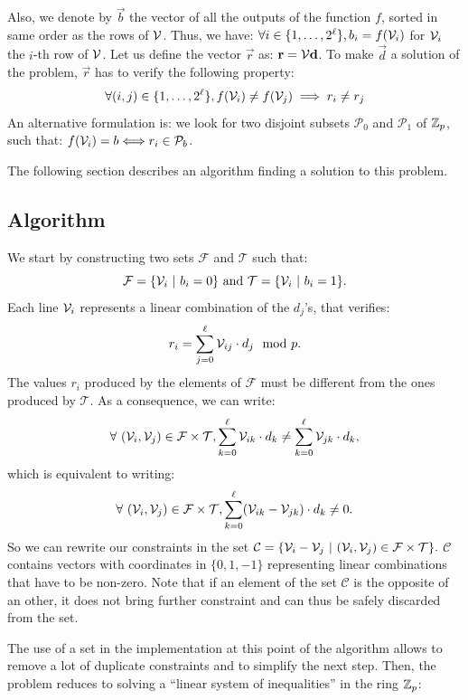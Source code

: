 Also, we denote by $\Vec{b}$ the vector of all the outputs of the function $f$, sorted in same order as the rows of $\mathcal V$. Thus, we have: $\forall i \in \{1, \dots, 2^\ell\}, b_i = f(\mathcal V_i)$
for $\mathcal V_i$ the $i$-th row of $\mathcal V$. Let us define the vector $\vec r$ as: $\Vec{r} = \mat V \vec{d}$. To make $\vec d$ a solution of the problem, $\vec r$ has to verify the following property:
\[
\forall (i, j) \in \{1, \dots, 2^\ell\}, f(\mathcal V_i) \neq f(\mathcal V_j) \implies r_i \neq r_j   
\]
An alternative formulation is: we look for two disjoint subsets $\mathcal{P}_0$ and $\mathcal{P}_1$ of $\mathbb{Z}_p$, such that: $f(\mathcal V_i) = b \Longleftrightarrow r_i \in \mathcal P_b$.

The following section describes an algorithm finding a solution to this problem.

\subsection{Algorithm}
\label{sec:search_algorithm}

We start by constructing two sets $\mathcal F$ and $\mathcal T$ such that: \[\mathcal F = \{\mathcal V_i ~\vert~ b_i = 0\} \text{ and } \mathcal T = \{\mathcal V_i ~\vert~ b_i = 1\}.\]
Each line $\mathcal V_i$ represents a linear combination of the $d_j$'s, that verifies:
\[r_i = \sum_{j=0}^{\ell} \mathcal V_{ij} \cdot d_j \mod p.\]
The values $r_i$ produced by the elements of $\mathcal{F}$ must be different from the ones produced by $\mathcal{T}$. As a consequence, we can write:
\[\forall~(\mathcal V_i, \mathcal V_j) \in \mathcal F \times \mathcal T, \sum_{k=0}^\ell \mathcal V_{ik} \cdot d_k \neq \sum_{k=0}^\ell \mathcal V_{jk} \cdot d_k,\] which is equivalent to writing:
\[\forall~(\mathcal V_i, \mathcal V_j) \in \mathcal F \times \mathcal T, \sum_{k=0}^\ell (\mathcal V_{ik} - \mathcal V_{jk}) \cdot d_k \neq 0.\]
So we can rewrite our constraints in the set $\mathcal C =  \{\mathcal V_i - \mathcal V_j ~\vert~ (\mathcal V_i, \mathcal V_j) \in \mathcal F \times \mathcal T\}.$ $\mathcal{C}$ contains vectors with coordinates in $\{0, 1, -1\}$ representing linear combinations that have to be non-zero. Note that if an element of the set $\mathcal{C}$ is the opposite of an other, it does not bring further constraint and can thus be safely discarded from the set.

The use of a set in the implementation at this point of the algorithm allows to remove a lot of duplicate constraints and to simplify the next step. Then, the problem reduces to solving a ``linear system of inequalities'' in the ring $\mathbb{Z}_p$: 


